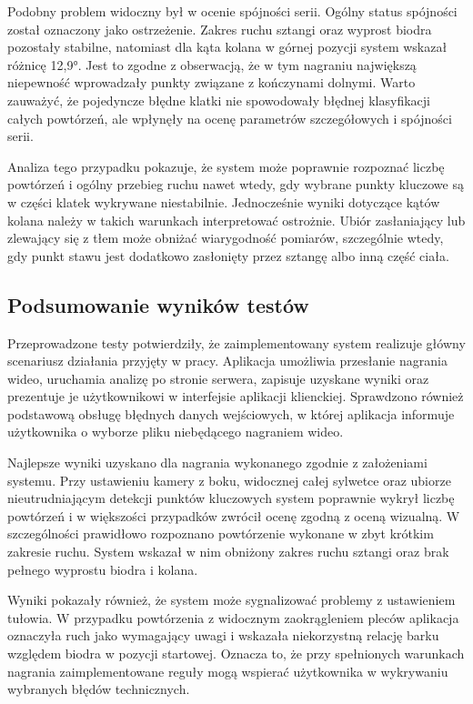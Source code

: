 Podobny problem widoczny był w ocenie spójności serii. Ogólny status spójności został oznaczony jako ostrzeżenie. Zakres ruchu sztangi oraz wyprost biodra pozostały stabilne, natomiast dla kąta kolana w górnej pozycji system wskazał różnicę 12{,}9°. Jest to zgodne z obserwacją, że w tym nagraniu największą niepewność wprowadzały punkty związane z kończynami dolnymi. Warto zauważyć, że pojedyncze błędne klatki nie spowodowały błędnej klasyfikacji całych powtórzeń, ale wpłynęły na ocenę parametrów szczegółowych i spójności serii.

Analiza tego przypadku pokazuje, że system może poprawnie rozpoznać liczbę powtórzeń i ogólny przebieg ruchu nawet wtedy, gdy wybrane punkty kluczowe są w części klatek wykrywane niestabilnie. Jednocześnie wyniki dotyczące kątów kolana należy w takich warunkach interpretować ostrożnie. Ubiór zasłaniający lub zlewający się z tłem może obniżać wiarygodność pomiarów, szczególnie wtedy, gdy punkt stawu jest dodatkowo zasłonięty przez sztangę albo inną część ciała.

\subsection{Podsumowanie wyników testów}

Przeprowadzone testy potwierdziły, że zaimplementowany system realizuje główny scenariusz działania przyjęty w pracy. Aplikacja umożliwia przesłanie nagrania wideo, uruchamia analizę po stronie serwera, zapisuje uzyskane wyniki oraz prezentuje je użytkownikowi w interfejsie aplikacji klienckiej. Sprawdzono również podstawową obsługę błędnych danych wejściowych, w której aplikacja informuje użytkownika o wyborze pliku niebędącego nagraniem wideo.

Najlepsze wyniki uzyskano dla nagrania wykonanego zgodnie z założeniami systemu. Przy ustawieniu kamery z boku, widocznej całej sylwetce oraz ubiorze nieutrudniającym detekcji punktów kluczowych system poprawnie wykrył liczbę powtórzeń i w większości przypadków zwrócił ocenę zgodną z oceną wizualną. W szczególności prawidłowo rozpoznano powtórzenie wykonane w zbyt krótkim zakresie ruchu. System wskazał w nim obniżony zakres ruchu sztangi oraz brak pełnego wyprostu biodra i kolana.

Wyniki pokazały również, że system może sygnalizować problemy z ustawieniem tułowia. W przypadku powtórzenia z widocznym zaokrągleniem pleców aplikacja oznaczyła ruch jako wymagający uwagi i wskazała niekorzystną relację barku względem biodra w pozycji startowej. Oznacza to, że przy spełnionych warunkach nagrania zaimplementowane reguły mogą wspierać użytkownika w wykrywaniu wybranych błędów technicznych.

